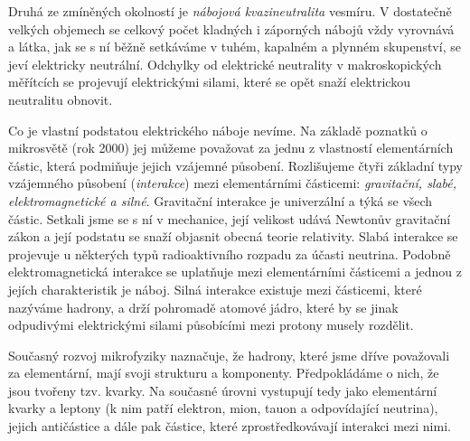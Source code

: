       Druhá ze zmíněných okolností je \emph{nábojová kvazineutralita} vesmíru. V dostatečně velkých
      objemech se celkový počet kladných i záporných nábojů vždy vyrovnává a látka, jak se s ní
      běžně setkáváme v tuhém, kapalném a plynném skupenství, se jeví elektricky neutrální. Odchylky
      od elektrické neutrality v makroskopických měřítcích se projevují elektrickými silami, které
      se opět snaží elektrickou neutralitu obnovit.

      \begin{tcnote}
        Co je vlastní podstatou elektrického náboje nevíme. Na základě poznatků o mikrosvětě (rok
        2000) jej můžeme považovat za jednu z vlastností elementárních částic, která podmiňuje
        jejich vzájemné působení. Rozlišujeme čtyři základní typy vzájemného působení
        (\emph{interakce}) mezi elementárními částicemi: \emph{gravitační, slabé, elektromagnetické
        a silné}. Gravitační interakce je univerzální a týká se všech částic. Setkali jsme se s ní v
        mechanice, její velikost udává Newtonův gravitační zákon a její podstatu se snaží objasnit
        obecná teorie relativity. Slabá interakce se projevuje u některých typů radioaktivního
        rozpadu za účasti neutrina. Podobně elektromagnetická interakce se uplatňuje mezi
        elementárními částicemi a jednou z jejích charakteristik je náboj. Silná interakce existuje
        mezi částicemi, které nazýváme hadrony, a drží pohromadě atomové jádro, které by se jinak
        odpudivými elektrickými silami působícími mezi protony musely rozdělit.
        
        Současný rozvoj mikrofyziky naznačuje, že hadrony, které jsme dříve považovali za
        elementární, mají svoji strukturu a komponenty. Předpokládáme o nich, že jsou tvořeny tzv.
        kvarky. Na současné úrovni vystupují tedy jako elementární kvarky a leptony (k nim patří
        elektron, mion, tauon a odpovídající neutrina), jejich antičástice a dále pak částice, které
        zprostředkovávají interakci mezi nimi.
      \end{tcnote}

        
    
